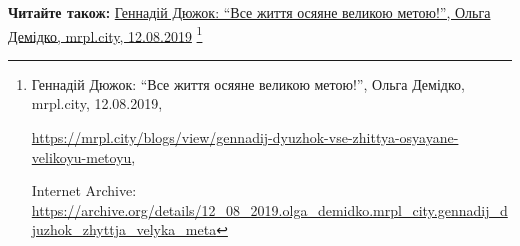  
 
 
 
 

\def\pubIA{https://archive.org/details/12_08_2019.olga_demidko.mrpl_city.gennadij_djuzhok_zhyttja_velyka_meta}
\def\pubTitle{Геннадій Дюжок: \enquote{Все життя осяяне великою метою!}}
\def\pubDate{12.08.2019}
\def\pubOrigin{https://mrpl.city/blogs/view/gennadij-dyuzhok-vse-zhittya-osyayane-velikoyu-metoyu}
\def\pubAuthor{Ольга Демідко}

\textbf{Читайте також:} \href{\pubIA}{%
\pubTitle, \pubAuthor, mrpl.city, \pubDate}%
\footnote{\pubTitle, \pubAuthor, mrpl.city, \pubDate, \par\url{\pubOrigin}, \par Internet Archive: \url{\pubIA}}

